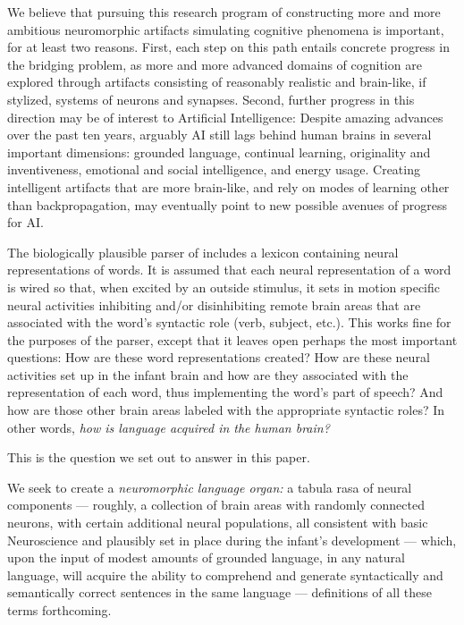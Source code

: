\documentclass{article}
\begin{document}
We believe that pursuing this research program of constructing more and more ambitious neuromorphic artifacts simulating cognitive phenomena is important, for at least two reasons.  First, each step on this path entails concrete progress in the bridging problem, as more and more advanced domains of cognition are explored through artifacts consisting of reasonably realistic and brain-like, if stylized, systems of neurons and synapses.  Second, further progress in this direction may be of interest to Artificial Intelligence: Despite amazing advances over the past ten years, arguably AI still lags behind human brains in several important dimensions: grounded language, continual learning, originality and inventiveness, emotional and social intelligence, and energy usage.  Creating intelligent artifacts that are more brain-like, and rely on modes of learning other than backpropagation, may eventually point to new possible avenues of progress for AI.

The biologically plausible parser of \citet{Parser} includes a lexicon containing neural representations of words. It is assumed that each neural representation of a word is wired so that, when excited by an outside stimulus, it sets in motion specific neural activities inhibiting and/or disinhibiting remote brain areas that are associated with the word's syntactic role (verb, subject, etc.). This works fine for the purposes of the parser, except that it leaves open perhaps the most important questions: How are these word representations created?  How are these neural activities set up in the infant brain and how are they associated with the representation of each word, thus implementing the word's part of speech?  And how are those other brain areas labeled with the appropriate syntactic roles?  In other words, \emph{how is language acquired in the human brain?} 

This is the question we set out to answer in this paper.

We seek to create a \emph{neuromorphic language organ:} a tabula rasa of neural components --- roughly, a collection of brain areas with randomly connected neurons, with certain additional neural populations, all consistent with basic Neuroscience and plausibly set in place during the infant's development --- which, upon the input of modest amounts of {grounded language,} in any natural language, will acquire the ability to comprehend and generate syntactically and semantically correct sentences in the same language --- definitions of all these terms forthcoming. 
\end{document}
